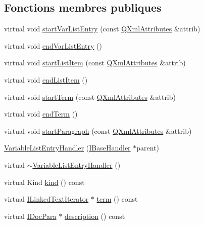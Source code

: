 \subsection*{Fonctions membres publiques}
\begin{DoxyCompactItemize}
\item 
virtual void \hyperlink{class_variable_list_entry_handler_a3138e2c39ca79e885ffcbf389cc73345}{start\+Var\+List\+Entry} (const \hyperlink{class_q_xml_attributes}{Q\+Xml\+Attributes} \&attrib)
\item 
virtual void \hyperlink{class_variable_list_entry_handler_aacc276103a2f1dc3827addd8dd18ecd0}{end\+Var\+List\+Entry} ()
\item 
virtual void \hyperlink{class_variable_list_entry_handler_a05b03ee398629c32421508d0d83b5e65}{start\+List\+Item} (const \hyperlink{class_q_xml_attributes}{Q\+Xml\+Attributes} \&attrib)
\item 
virtual void \hyperlink{class_variable_list_entry_handler_aecde29efdba1024b1e16a1ceee0a51c0}{end\+List\+Item} ()
\item 
virtual void \hyperlink{class_variable_list_entry_handler_adf20801d540afe8ba4f54e55d203a1a8}{start\+Term} (const \hyperlink{class_q_xml_attributes}{Q\+Xml\+Attributes} \&attrib)
\item 
virtual void \hyperlink{class_variable_list_entry_handler_a35bba5f63b8ccc4c336fa78e6659446e}{end\+Term} ()
\item 
virtual void \hyperlink{class_variable_list_entry_handler_a869f46490234257e465b9ad99f01035c}{start\+Paragraph} (const \hyperlink{class_q_xml_attributes}{Q\+Xml\+Attributes} \&attrib)
\item 
\hyperlink{class_variable_list_entry_handler_a93169f0e359fd1003a548f1e1023db18}{Variable\+List\+Entry\+Handler} (\hyperlink{class_i_base_handler}{I\+Base\+Handler} $\ast$parent)
\item 
virtual \hyperlink{class_variable_list_entry_handler_ae8cb376a193afc38371938e4a505248c}{$\sim$\+Variable\+List\+Entry\+Handler} ()
\item 
virtual Kind \hyperlink{class_variable_list_entry_handler_aa3c719e47f4b3632a7f87a84f59a9315}{kind} () const 
\item 
virtual \hyperlink{class_i_linked_text_iterator}{I\+Linked\+Text\+Iterator} $\ast$ \hyperlink{class_variable_list_entry_handler_a224454f4c84c7eded77099f93ab324d7}{term} () const 
\item 
virtual \hyperlink{class_i_doc_para}{I\+Doc\+Para} $\ast$ \hyperlink{class_variable_list_entry_handler_aa0ba4b3091c0f97a8fc7b12b70037ead}{description} () const 
\end{DoxyCompactItemize}
